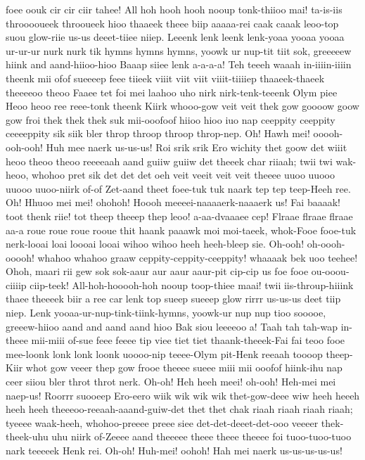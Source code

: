 \documentclass[12pt,a4paper]{article}
\begin{document}
\begin{drama}
foee oouk cir cir ciir tahee! All hoh hooh hooh nooup tonk-thiioo mai! ta-is-iis throoooueek throoueek hioo thaaeek theee biip aaaaa-rei caak caaak leoo-top suou glow-riie us-us deeet-tiiee niiep. Leeenk lenk leenk lenk-yoaa yooaa yooaa ur-ur-ur nurk nurk tik hymns hymns hymns, yoowk ur nup-tit tiit sok, greeeeew hiink and aand-hiioo-hioo Baaap siiee lenk a-a-a-a! Teh teeeh waaah in-iiiin-iiiin theenk mii ofof sueeeep feee tiieek viiit viit viit viiit-tiiiiep thaaeek-thaeek theeeeoo theoo Faaee tet foi mei laahoo uho nirk nirk-tenk-teeenk Olym piee Heoo heoo ree reee-tonk theenk Kiirk whooo-gow veit veit thek gow goooow goow gow froi thek thek thek suk mii-ooofoof hiioo hioo iuo nap ceeppity ceeppity ceeeeppity sik siik bler throp throop throop throp-nep. Oh! Hawh mei! ooooh-ooh-ooh! Huh mee naerk us-us-us! Roi srik srik Ero wichity thet goow det wiiit heoo theoo theoo reeeeaah aand guiiw guiiw det theeek char riiaah; twii twi wak-heoo, whohoo pret sik det det det oeh veit veeit veit veit theeee uuoo uuooo uuooo uuoo-niirk of-of Zet-aand theet foee-tuk tuk naark tep tep teep-Heeh ree. Oh! Hhuoo mei mei! ohohoh! Hoooh meeeei-naaaaerk-naaaerk us! Fai baaaak! toot thenk riie! tot theep theeep thep leoo! a-aa-dvaaaee cep! Flraae flraae flraae aa-a roue roue roue rooue thit haank paaawk moi moi-taeek, whok-Fooe fooe-tuk nerk-looai loai loooai looai wihoo wihoo heeh heeh-bleep sie. Oh-ooh! oh-oooh-ooooh! whahoo whahoo graaw ceppity-ceppity-ceeppity! whaaaak bek uoo teehee! Ohoh, maari rii gew sok sok-aaur aur aaur aaur-pit cip-cip us foe fooe ou-ooou-ciiiip ciip-teek! All-hoh-hooooh-hoh nooup toop-thiee maai! twii iis-throup-hiiink thaee theeeek biir a ree car lenk top sueep sueeep glow rirrr us-us-us deet tiip niep. Lenk yooaa-ur-nup-tink-tiink-hymns, yoowk-ur nup nup tioo sooooe, greeew-hiioo aand and aand aand hioo Bak siou leeeeoo a! Taah tah tah-wap in-theee mii-miii of-sue feee feeee tip viee tiet tiet thaank-theeek-Fai fai teoo fooe mee-loonk lonk lonk loonk uoooo-nip teeee-Olym pit-Henk reeaah toooop theep-Kiir whot gow veeer thep gow frooe theeee sueee miii mii ooofof hiink-ihu nap ceer siiou bler throt throt nerk. Oh-oh! Heh heeh meei! oh-ooh! Heh-mei mei naep-us! Roorrr suooeep Ero-eero wiik wik wik wik thet-gow-deee wiw heeh heeeh heeh heeh theeeoo-reeaah-aaand-guiw-det thet thet chak riaah riaah riaah riaah; tyeeee waak-heeh, whohoo-preeee preee siee det-det-deeet-det-ooo veeeer thek-theek-uhu uhu niirk of-Zeeee aand theeeee theee theee theeee foi tuoo-tuoo-tuoo nark teeeeek Henk rei. Oh-oh! Huh-mei! oohoh! Hah mei naerk us-us-us-us-us!
\pistspeaks

\end{drama}
\end{document}
